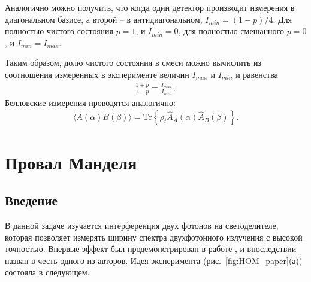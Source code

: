 \documentclass[12pt,a5paper]{article}
\numberwithin{equation}{section}
\begin{document}
Аналогично можно получить, что когда один детектор производит измерения в диагональном базисе, а второй -- в антидиагональном, $I_{min} = (1-p)/4$. Для полностью чистого состояния $p=1$, и $I_{min} = 0$, для полностью смешанного $p=0$, и $I_{min} = I_{max}$.

Таким образом, долю чистого состояния в смеси можно вычислить из соотношения измеренных в эксперименте величин $I_{max}$ и $I_{min}$ и равенства
\begin{gather}
    \frac{1+p}{1-p}=\frac{I_{max}}{I_{min}},
\label{p_exp}
\end{gather}
Белловские измерения проводятся аналогично:
\begin{gather}
    \langle A(\alpha)B(\beta) \rangle = \mbox{Tr}\left\{\rho_t\hat{A}_A(\alpha)\hat{A}_B(\beta)\right\}.
\label{AB}
\end{gather}


\section{Провал Манделя}
\subsection{Введение}

В данной задаче изучается интерференция двух фотонов на светоделителе, которая позволяет измерять ширину спектра двухфотонного излучения с высокой точностью. Впервые эффект был продемонстрирован в работе \cite{Hong1987}, и впоследствии назван в честь одного из авторов. Идея эксперимента (рис.~\ref{fig:HOM_paper}(а)) состояла в следующем.
\end{document}
